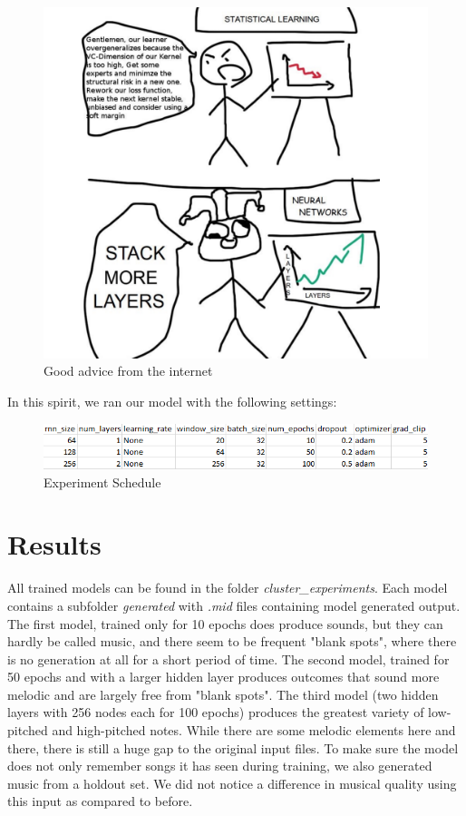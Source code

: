 \documentclass{article}
\begin{document}
\begin{figure}[H]
    \centering
    \includegraphics[scale=0.28]{stack_more_layers.png}
    \caption{Good advice from the internet}
    \label{fig:good_advice}
\end{figure}

In this spirit, we ran our model with the following settings:
\begin{figure}[H]
    \centering
    \includegraphics[scale=0.8]{experiment_schedule_2.png}
    \caption{Experiment Schedule}
    \label{fig:experiment_schedule1}
\end{figure}

\section{Results}
All trained models can be found in the folder \textit{cluster\_experiments}. Each model contains a subfolder \textit{generated} with \textit{.mid} files containing model generated output. The first model, trained only for 10 epochs does produce sounds, but they can hardly be called music, and there seem to be frequent "blank spots", where there is no generation at all for a short period of time. The second model, trained for 50 epochs and with a larger hidden layer produces outcomes that sound more melodic and are largely free from "blank spots". The third model (two hidden layers with 256 nodes each for 100 epochs) produces the greatest variety of low-pitched and high-pitched notes. While there are some melodic elements here and there, there is still a huge gap to the original input files. To make sure the model does not only remember songs it has seen during training, we also generated music from a holdout set. We did not notice a difference in musical quality using this input as compared to before.
\end{document}
